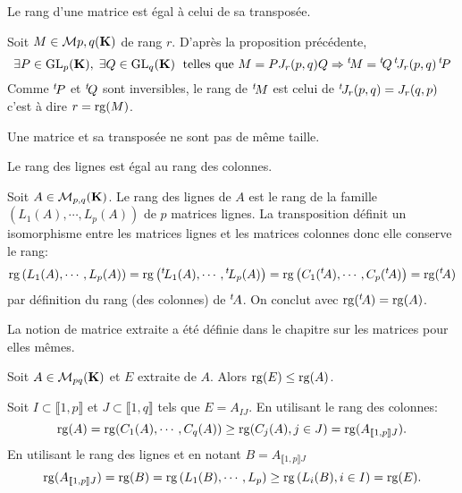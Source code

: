 \begin{propn}
  Le rang d'une matrice est égal à celui de sa transposée.
\end{propn}
\begin{demo}
Soit $M \in \mathcal{M}{p,q}(\mathbf{K})$ de rang $r$. D'après la proposition précédente,
\begin{displaymath}
  \exists P \in \text{GL}_p(\mathbf{K}), \; \exists Q \in \text{GL}_q(\mathbf{K})\;\text{ telles que } M = P J_r(p,q) Q
  \Rightarrow \mathstrut^t\!{M} = \mathstrut^t\!{Q}\, \mathstrut^t\!{J_r(p,q)}\, \mathstrut^t\!{P}
\end{displaymath}
Comme $\mathstrut^t\!{P}$ et $\mathstrut^t\!{Q}$ sont inversibles, le rang de $\mathstrut^t\!{M}$ est celui de $\mathstrut^t\!{J_r(p,q)} = J_r(q,p)$ c'est à dire $r = \mathop{\mathrm{rg}}(M)$.
\end{demo}
\begin{rem}
  Une matrice et sa transposée ne sont pas de même taille.
\end{rem}
\begin{propn}
  Le rang des lignes est égal au rang des colonnes.
\end{propn}
\begin{demo}
 Soit $A \in \mathcal{M}_{p, q}(\mathbf{K})$. Le rang des lignes de $A$ est le rang de la famille $\left( L_1(A),\cdots, L_p(A)\right)$ de $p$ matrices lignes. La transposition définit un isomorphisme entre les matrices lignes et les matrices colonnes donc elle conserve le rang:
\[
 \mathop{\mathrm{rg}}\left( L_1(A),\cdots, L_p(A)\right) = \mathop{\mathrm{rg}} \left( \mathstrut^t\!{L_1(A)},\cdots, \mathstrut^t\!{L_p(A)}\right)
 = \mathop{\mathrm{rg}}\left( C_1(\mathstrut^t\!{A}),\cdots, C_p(\mathstrut^t\!{A})\right)
 = \mathop{\mathrm{rg}}(\mathstrut^t\!{A})
\]
par définition du rang (des colonnes) de $\mathstrut^t\!{A}$. On conclut avec $\mathop{\mathrm{rg}}(\mathstrut^t\!{A}) = \mathop{\mathrm{rg}}(A)$.
\end{demo}
\noindent La notion de matrice extraite  a été définie dans le chapitre sur les matrices pour elles mêmes.
\begin{propn}
 Soit $A \in \mathcal{M}_{pq}(\mathbf{K})$ et $E$ extraite de $A$. Alors $\mathop{\mathrm{rg}}(E) \leq \mathop{\mathrm{rg}}(A)$.
\end{propn}
\begin{demo}
Soit $I\subset\llbracket 1,p \rrbracket$ et $J \subset \llbracket 1,q \rrbracket$ tels que $E = A_{I J}$.\newline
En utilisant le rang des colonnes: 
\[
 \mathop{\mathrm{rg}}(A) = \mathop{\mathrm{rg}}(C_1(A), \cdots, C_q(A)) \geq \mathop{\mathrm{rg}}(C_j(A), j\in J) = \mathop{\mathrm{rg}}(A_{\llbracket 1, p\rrbracket J}).
\]
En utilisant le rang des lignes et en notant $B = A_{\llbracket 1, p\rrbracket J}$
\[
\mathop{\mathrm{rg}}(A_{\llbracket 1, p\rrbracket J}) = \mathop{\mathrm{rg}}(B) = \mathop{\mathrm{rg}}\left( L_1(B), \cdots, L_p\right)
 \geq \mathop{\mathrm{rg}}\left( L_i(B), i \in I\right) = \mathop{\mathrm{rg}}(E). 
\]
\end{demo}

